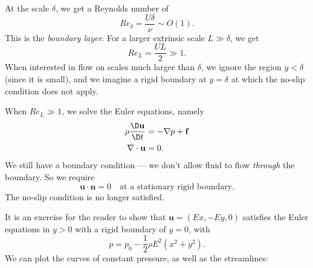 \documentclass[a4paper]{article}
\begin{document}
\begin{eg}
\begin{center}
  \end{center}
  At the scale $\delta$, we get a Reynolds number of
  \[
    Re_\delta = \frac{U\delta}{\nu}\sim O(1).
  \]
  This is the \emph{boundary layer}. For a larger extrinsic scale $L \gg \delta$, we get
  \[
    Re_L = \frac{UL}{2} \gg 1.
  \]
  When interested in flow on scales much larger than $\delta$, we ignore the region $y < \delta$ (since it is small), and we imagine a rigid boundary at $y = \delta$ at which the no-slip condition does not apply.

  When $Re_L \gg 1$, we solve the Euler equations, namely
  \begin{align*}
    \rho \frac{\D \mathbf{u}}{\D t} &= - \nabla p + \mathbf{f}\\
    \nabla \cdot \mathbf{u} &= 0.
  \end{align*}
  We still have a boundary condition --- we don't allow fluid to flow \emph{through} the boundary. So we require
  \[
    \mathbf{u}\cdot \mathbf{n} = 0\quad\text{at a stationary rigid boundary}.
  \]
  The no-slip condition is no longer satisfied.

  It is an exercise for the reader to show that $\mathbf{u} = (Ex, -Ey, 0)$ satisfies the Euler equations in $y > 0$ with a rigid boundary of $y = 0$, with
  \[
    p = p_0 - \frac{1}{2} \rho E^2(x^2 + y^2).
  \]
  We can plot the curves of constant pressure, as well as the streamlines:
  \begin{center}
\end{center}
\end{eg}
\end{document}
